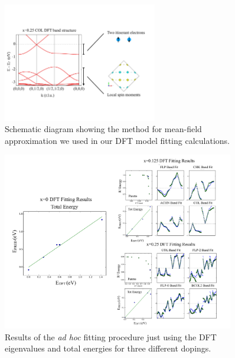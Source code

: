 \documentclass{article}
\begin{document}
\begin{figure}[H]
\centering
\includegraphics[width=0.6\textwidth]{Figures/R1-mean_field.pdf}
\caption{\label{fig3} Schematic diagram showing the method for mean-field approximation we used in our DFT model fitting calculations.}
\end{figure}

\begin{figure}[H]
\centering
\includegraphics[width=0.9\textwidth]{Figures/R2-pareto.pdf}
\caption{\label{fig4} Results of the \textit{ad hoc} fitting procedure just using the DFT eigenvalues and total energies for three different dopings.}
\end{figure}
\end{document}
